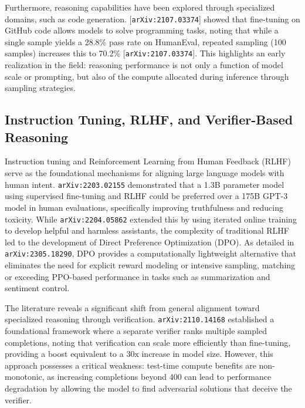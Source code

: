 \documentclass[11pt]{article}
\begin{document}
Furthermore, reasoning capabilities have been explored through specialized domains, such as code generation. [\texttt{arXiv:2107.03374}] showed that fine-tuning on GitHub code allows models to solve programming tasks, noting that while a single sample yields a 28.8\% pass rate on HumanEval, repeated sampling (100 samples) increases this to 70.2\% [\texttt{arXiv:2107.03374}]. This highlights an early realization in the field: reasoning performance is not only a function of model scale or prompting, but also of the compute allocated during inference through sampling strategies.

\subsection{Instruction Tuning, RLHF, and Verifier-Based Reasoning}

Instruction tuning and Reinforcement Learning from Human Feedback (RLHF) serve as the foundational mechanisms for aligning large language models with human intent. \texttt{arXiv:2203.02155} demonstrated that a 1.3B parameter model using supervised fine-tuning and RLHF could be preferred over a 175B GPT-3 model in human evaluations, specifically improving truthfulness and reducing toxicity. While \texttt{arXiv:2204.05862} extended this by using iterated online training to develop helpful and harmless assistants, the complexity of traditional RLHF led to the development of Direct Preference Optimization (DPO). As detailed in \texttt{arXiv:2305.18290}, DPO provides a computationally lightweight alternative that eliminates the need for explicit reward modeling or intensive sampling, matching or exceeding PPO-based performance in tasks such as summarization and sentiment control.

The literature reveals a significant shift from general alignment toward specialized reasoning through verification. \texttt{arXiv:2110.14168} established a foundational framework where a separate verifier ranks multiple sampled completions, noting that verification can scale more efficiently than fine-tuning, providing a boost equivalent to a 30x increase in model size. However, this approach possesses a critical weakness: test-time compute benefits are non-monotonic, as increasing completions beyond 400 can lead to performance degradation by allowing the model to find adversarial solutions that deceive the verifier.
\end{document}

